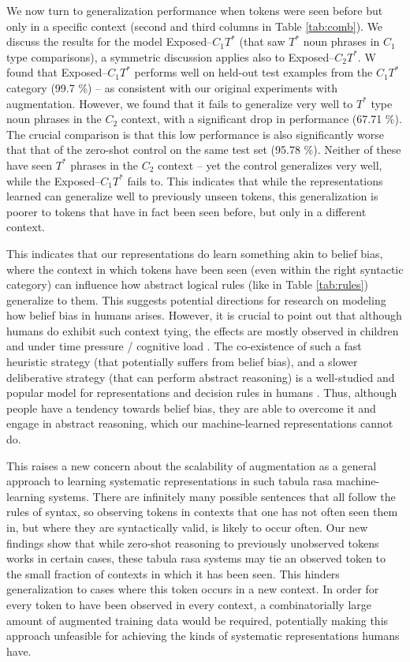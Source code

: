 We now turn to generalization performance when tokens were seen before but only in a specific context (second and third columns in Table \ref{tab:comb}). We discuss the results for the model Exposed--$C_{1}T^{*}$ (that saw $T^{*}$ noun phrases in $C_{1}$ type comparisons), a symmetric discussion applies also to Exposed--$C_{2}T^{*}$.  W found that Exposed--$C_{1}T^{*}$ performs well on held-out test examples from the $C_{1}T^{*}$ category (99.7 \%) -- as consistent with our original experiments with augmentation. However, we found that it fails to generalize very well to $T^{*}$ type noun phrases in the $C_{2}$ context, with a significant drop in performance (67.71 \%). The crucial comparison is that this low performance is also significantly worse that that of the zero-shot control on the same test set (95.78 \%). Neither of these have seen $T^{*}$ phrases in the $C_{2}$ context -- yet the control generalizes very well, while the Exposed--$C_{1}T^{*}$ fails to. This indicates that while the representations learned can generalize well to previously unseen tokens, this generalization is poorer to tokens that have in fact been seen before, but only in a different context.

This indicates that our representations do learn something akin to belief bias, where the context in which tokens have been seen (even within the right syntactic category) can influence how abstract logical rules (like in Table \ref{tab:rules}) generalize to them. This suggests potential directions for research on modeling how belief bias in humans arises. However, it is crucial to point out that although humans do exhibit such context tying, the effects are mostly observed in children \citep{evans1995belief} and under time pressure / cognitive load \citep{evans2005rapid}. The co-existence of such a fast heuristic strategy (that potentially suffers from belief bias), and a slower deliberative strategy (that can perform abstract reasoning) is a well-studied and popular model for representations and decision rules in humans \citep{evans2005rapid, kahneman2011thinking, groves1970habituation}. Thus, although people have a tendency towards belief bias, they are able to overcome it and engage in abstract reasoning, which our machine-learned representations cannot do.

This raises a new concern about the scalability of augmentation as a general approach to learning systematic representations in such tabula rasa machine-learning systems. There are infinitely many possible sentences that all follow the rules of syntax, so observing tokens in contexts that one has not often seen them in, but where they are syntactically valid, is likely to occur often. Our new findings show that while zero-shot reasoning to previously unobserved tokens works in certain cases, these tabula rasa systems may tie an observed token to the small fraction of contexts in which it has been seen. This hinders generalization to cases where this token occurs in a new context. In order for every token to have been observed in every context, a combinatorially large amount of augmented training data would be required, potentially making this approach unfeasible for achieving the kinds of systematic representations humans have.
 
